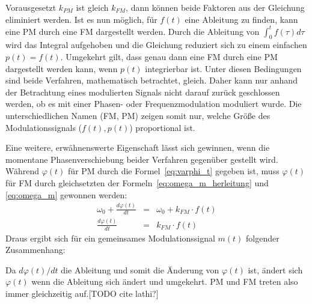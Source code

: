 Vorausgesetzt \(k_{PM}\) ist gleich \(k_{FM}\), dann können beide Faktoren aus der Gleichung eliminiert werden. Ist es nun möglich, für \(f(t)\) eine Ableitung zu finden, kann eine PM durch eine FM dargestellt werden. Durch die Ableitung von \(\int_0^t{f(\tau)}d\tau\) wird das Integral aufgehoben und die Gleichung reduziert sich zu einem einfachen \(p(t)=f(t)\). Umgekehrt gilt, dass genau dann eine FM durch eine PM dargestellt werden kann, wenn \(p(t)\) integrierbar ist. Unter diesen Bedingungen sind beide Verfahren, mathematisch betrachtet, gleich. Daher kann nur anhand der Betrachtung eines modulierten Signals nicht darauf zurück geschlossen werden, ob es mit einer Phasen- oder Frequenzmodulation moduliert wurde. Die unterschiedlichen Namen (FM, PM) zeigen somit nur, welche Größe des Modulationssignals (\(f(t), p(t)\)) proportional ist. \cite[S. 210]{lathi}

Eine weitere, erwähnenswerte Eigenschaft lässt sich gewinnen, wenn die momentane Phasenverschiebung beider Verfahren gegenüber gestellt wird. Während \(\varphi(t)\) für PM durch die Formel~\ref{eq:varphi_t} gegeben ist, muss \(\varphi(t)\) für FM durch gleichsetzten der Formeln~\ref{eq:omega_m_herleitung} und \ref{eq:omega_m} gewonnen werden:
\begin{eqnarray*}
\omega_0+\frac{d\varphi(t)}{dt}&=&\omega_0+k_{FM}\cdot f(t) \\
\frac{d\varphi(t)}{dt}&=&k_{FM}\cdot f(t)
\end{eqnarray*}
Draus ergibt sich für ein gemeinsames Modulationssignal \(m(t)\) folgender Zusammenhang:
\begin{center}
\end{center}
Da \({d\varphi(t)}/{dt}\) die Ableitung und somit die Änderung von \(\varphi(t)\) ist, ändert sich \(\varphi(t)\) wenn die Ableitung sich ändert und umgekehrt. PM und FM treten also immer gleichzeitig auf.[TODO cite lathi?]

